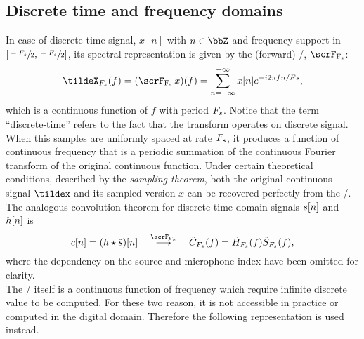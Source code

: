 \subsection{Discrete time and frequency domains}\label{subsec:processing:dtft_dft}
In case of discrete-time signal, $x[n]$ with $n \in \bbZ$ and frequency support in $[\sfrac{-F_s}{2}, \sfrac{-F_s}{2}]$, its spectral representation is given by the (forward) \DTFTdef/, $\dtft$:
\begin{equation}\label{eq:processing:dtft}
    \tildeX_{\Fs}(f) = (\dtft{x})(f) =
    \sum_{n = -\infty}^{+\infty}
    x[ n]
    \cste^{-\csti 2 \pi f n / Fs}
    ,
\end{equation}
which is a continuous function of $f$ with period $F_s$.
Notice that the term ``discrete-time'' refers to the fact that the transform operates on discrete signal.
When this samples are uniformly spaced at rate $F_s$, it produces a function of continuous frequency that is a periodic summation of the continuous Fourier transform of the original continuous function.
Under certain theoretical conditions, described by the \textit{sampling theorem}, both the original continuous signal $\tildex$ and its sampled version $x$ can be recovered perfectly from the \DTFT/.
\\The analogous convolution theorem for discrete-time domain signals $s[n]$ and $h[n]$ is
\begin{equation}\label{eq:processing:conv_dtft}
    \img[n] = \kparen{\rir \convCont \tilde{\src}} [ n]
    \mathspace\overset{\dtft}{\kto}\mathspace
    \tilde{\IMG}_{\Fs}( f) =  \tilde{\FLT}_{\Fs}( f) \tilde{\SRC}_{\Fs}( f)
    ,
\end{equation}
where the dependency on the source and microphone index have been omitted for clarity.
\\The \DTFT/ itself is a continuous function of frequency which require infinite discrete value to be computed.
For these two reason, it is not accessible in practice or computed in the digital domain.
Therefore the following representation is used instead.

